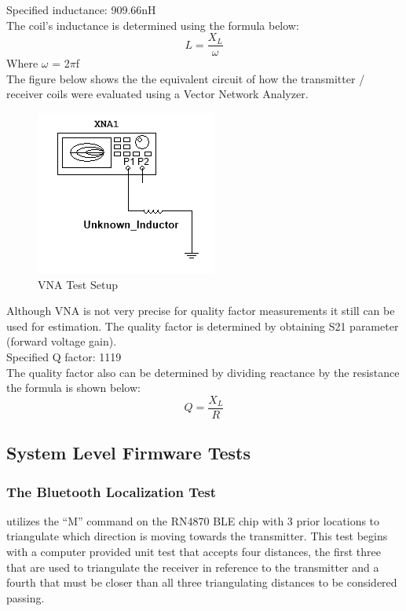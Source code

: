 \documentclass[12pt]{article}
\begin{document}
\noindent
Specified inductance: 909.66nH\\

\noindent
The coil's inductance is determined using the formula below:
\begin{equation}
L = \frac{X_L}{\omega}
\end{equation}
\noindent
Where $\omega$ = 2$\pi$f\\

\noindent
The figure below shows the the equivalent circuit of how the transmitter / receiver coils were evaluated using a Vector Network Analyzer.
\hfill
\begin{figure}[h!]
\centering
\includegraphics[width=0.5\linewidth]{RX_SUBSYSTEM_COIL_TERMINALS.PNG}
\caption{VNA Test Setup}
\end{figure}

\pagebreak

\noindent
Although VNA is not very precise for quality factor measurements it still can be used for estimation. The quality factor is determined by obtaining S21 parameter (forward voltage gain).\\

\noindent
Specified Q factor: 1119\\
 
 \noindent
The quality factor also can be determined by dividing reactance by the resistance the formula is shown below:
\begin{equation}
Q = \frac{X_L}{R}
\end{equation}

\subsection{System Level Firmware Tests}

\subsubsection*{The Bluetooth Localization Test} utilizes the “M” command on the RN4870 BLE chip with 3 prior locations to triangulate which direction is moving towards the transmitter.  This test begins with a computer provided unit test that accepts four distances, the first three that are used to triangulate the receiver in reference to the transmitter and a fourth that must be closer than all three triangulating distances to be considered passing.
\hfill 
\pagebreak
\end{document}
